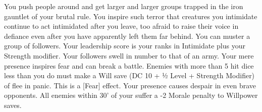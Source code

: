 {You push people around and get larger and larger groups trapped in the iron gauntlet of your brutal rule.}
{You inspire such terror that creatures you intimidate continue to act intimidated after you leave, too afraid to raise their voice in defiance even after you have apparently left them far behind.}
{You can muster a group of followers. Your leadership score is your ranks in Intimidate plus your Strength modifier.}
{Your followers swell in number to that of an army.}
{Your mere presence inspires fear and can break a battle. Enemies with more than 5 hit dice less than you do must make a Will save (DC 10 + ½ Level + Strength Modifier) of flee in panic. This is a [Fear] effect.}
{Your presence causes despair in even brave opponents. All enemies within 30' of your suffer a -2 Morale penalty to Willpower saves.}